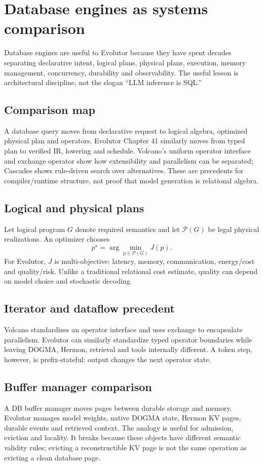 \chapter{Database engines as systems comparison}
Database engines are useful to Evolutor because they have spent decades separating declarative intent, logical plans, physical plans, execution, memory management, concurrency, durability and observability. The useful lesson is architectural discipline, not the slogan ``LLM inference is SQL.''

\section{Comparison map}
A database query moves from declarative request to logical algebra, optimized physical plan and operators. Evolutor Chapter 41 similarly moves from typed plan to verified IR, lowering and schedule. Volcano's uniform operator interface and exchange operator show how extensibility and parallelism can be separated; Cascades shows rule-driven search over alternatives. These are precedents for compiler/runtime structure, not proof that model generation is relational algebra.

\section{Logical and physical plans}
Let logical program $G$ denote required semantics and let $\mathcal P(G)$ be legal physical realizations. An optimizer chooses
\[
p^\star=\arg\min_{p\in\mathcal P(G)}J(p).
\]
For Evolutor, $J$ is multi-objective: latency, memory, communication, energy/cost and quality/risk. Unlike a traditional relational cost estimate, quality can depend on model choice and stochastic decoding.

\section{Iterator and dataflow precedent}
Volcano standardizes an operator interface and uses exchange to encapsulate parallelism. Evolutor can similarly standardize typed operator boundaries while leaving DOGMA, Hermon, retrieval and tools internally different. A token step, however, is prefix-stateful: output changes the next operator state.

\section{Buffer manager comparison}
A DB buffer manager moves pages between durable storage and memory. Evolutor manages model weights, native DOGMA state, Hermon KV pages, durable events and retrieved context. The analogy is useful for admission, eviction and locality. It breaks because these objects have different semantic validity rules; evicting a reconstructible KV page is not the same operation as evicting a clean database page.

